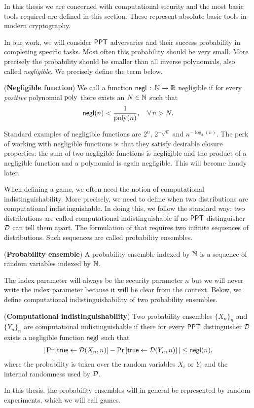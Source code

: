 In this thesis we are concerned with computational security and the most basic tools required are defined in this section. These represent absolute basic tools in modern cryptography. 

In our work, we will consider $\mathsf{PPT}$ adversaries and their success probability in completing specific tasks. Most often this probability should be very small. More precisely the probability should be smaller than all inverse polynomials, also called \emph{negligible}. We precisely define the term below.

\begin{defn}
(\textbf{Negligible function}) We call a function $\operatorname{\mathsf{negl}}\, :\, \mathbb{N}\rightarrow\mathbb{R}$ negligible if for every \emph{positive} polynomial $\operatorname{poly}$ there exists an $N\in\mathbb{N}$ such that
\begin{align*}
	\operatorname{\mathsf{negl}}(n) < \frac{1}{\operatorname{poly}(n)},\quad \forall\, n>N.
\end{align*}
\end{defn}
Standard examples of negligible functions are $2^n$, $2^{-\sqrt{n}}$ and $n^{-\log_2(n)}$. The perk of working with negligible functions is that they satisfy desirable closure properties: the sum of two negligible functions is negligible and the product of a negligible function and a polynomial is again negligible. This will become handy later. 

When defining a game, we often need the notion of computational indistinguishability. More precisely, we need to define when two distributions are computational indistinguishable. In doing this, we follow the standard way: two distributions are called computational indistinguishable if no $\mathsf{PPT}$ distinguisher $\operatorname{\mathcal{D}}$ can tell them apart. The formulation of that requires two infinite sequences of distributions. Such sequences are called probability ensembles.

\begin{defn}
(\textbf{Probability ensemble}) A probability ensemble indexed by $\mathbb{N}$ is a sequence of random variables indexed by $\mathbb{N}$. 
\end{defn}

The index parameter will always be the security parameter $n$ but we will never write the index parameter because it will be clear from the context. Below, we define computational indistinguishability of two probability ensembles. 

\begin{defn}
(\textbf{Computational indistinguishability}) Two probability ensembles $\{X_n\}_n$ and $\{Y_n\}_n$ are computational indistinguishable if there for every $\mathsf{PPT}$ distinguisher $\operatorname{\mathcal{D}}$ exists a negligible function $\operatorname{\mathsf{negl}}$ such that 
\begin{align*}
	\vert \operatorname{Pr}\left[{\mathsf{true}\leftarrow \operatorname{\mathcal{D}}(X_n,n)}\right]-\operatorname{Pr}\left[{\mathsf{true}\leftarrow\operatorname{\mathcal{D}}(Y_n,n)}\right]\vert \leq \operatorname{\mathsf{negl}}(n),
\end{align*}
where the probability is taken over the random variables $X_i$ or $Y_i$ and the internal randomness used by $\operatorname{\mathcal{D}}$. 
\end{defn}
In this thesis, the probability ensembles will in general be represented by random experiments, which we will call games. 

